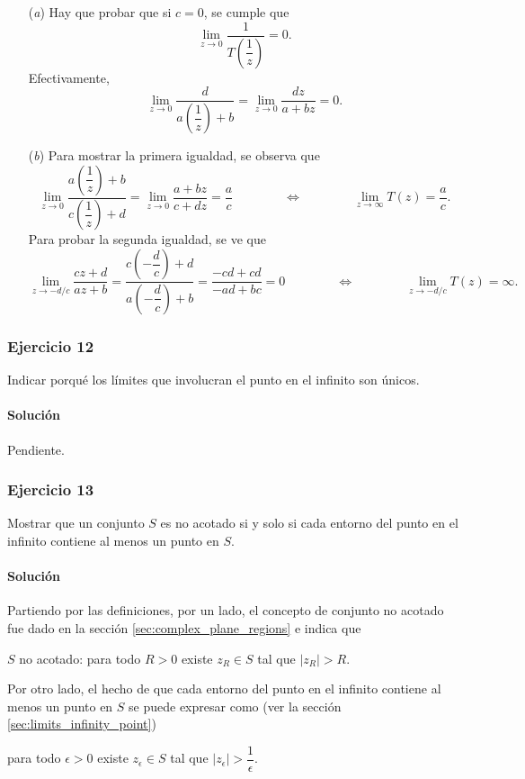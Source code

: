 \documentclass[a4paper]{report}
\begin{document}
\begin{enumerate}
 \item[(\textit{a})] Hay que probar que si \(c=0\), se cumple que
 \[
  \lim_{z\to0}\dfrac{1}{T\left(\dfrac{1}{z}\right)}=0.
 \]
 Efectivamente,
 \[
  \lim_{z\to0}\dfrac{d}{a\left(\dfrac{1}{z}\right)+b}=
  \lim_{z\to0}\dfrac{dz}{a+bz}=0.
 \]
 \item[(\textit{b})] Para mostrar la primera igualdad, se observa que 
 \[
  \lim_{z\to0}\dfrac{a\left(\dfrac{1}{z}\right)+b}{c\left(\dfrac{1}{z}\right)+d}=
  \lim_{z\to0}\dfrac{a+bz}{c+dz}=
  \frac{a}{c}
  \qquad\qquad\Leftrightarrow\qquad\qquad
  \lim_{z\to\infty}T(z)=\frac{a}{c}.
 \]
 Para probar la segunda igualdad, se ve que 
 \[
  \lim_{z\to-d/c}\frac{cz+d}{az+b}=
  \dfrac{c\left(-\dfrac{d}{c}\right)+d}{a\left(-\dfrac{d}{c}\right)+b}=
  \frac{-cd+cd}{-ad+bc}=0
  \qquad\qquad\Leftrightarrow\qquad\qquad
  \lim_{z\to-d/c}T(z)=\infty.
 \]
\end{enumerate}
 
\subsubsection{Ejercicio 12}

Indicar porqué los límites que involucran el punto en el infinito son únicos.

\paragraph{Solución} Pendiente.

\subsubsection{Ejercicio 13}

Mostrar que un conjunto \(S\) es no acotado si y solo si cada entorno del punto en el infinito contiene al menos un punto en \(S\).

\paragraph{Solución} Partiendo por las definiciones, por un lado, el concepto de conjunto no acotado fue dado en la sección \ref{sec:complex_plane_regions} e indica que
\begin{center}
 \(S\) no acotado: para todo \(R>0\) existe \(z_R\in S\) tal que \(|z_R|>R\).
\end{center}
Por otro lado, el hecho de que cada entorno del punto en el infinito contiene al menos un punto en \(S\) se puede expresar como (ver la sección \ref{sec:limits_infinity_point})
\begin{center}
 para todo \(\epsilon>0\) existe \(z_\epsilon\in S\) tal que \(|z_\epsilon|>\dfrac{1}{\epsilon}\).
\end{center}
\end{document}
